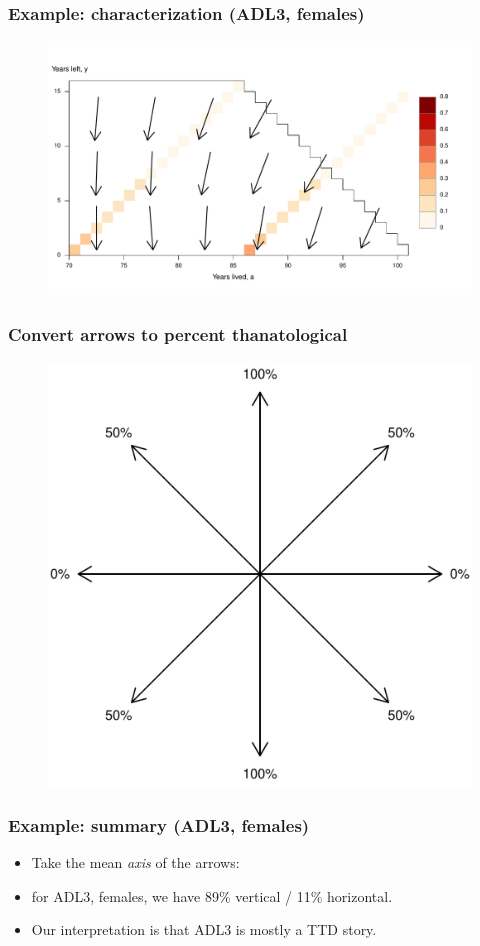 \documentclass{beamer}
\begin{document}
\begin{frame}
\frametitle{Example: characterization (ADL3, females)}
\begin{figure}
\includegraphics[width=\linewidth]{Figures/SurfExampleFemalesADL3_3}
\end{figure}
\end{frame}

\begin{frame}
\frametitle{Convert arrows to percent thanatological}
\vspace{-1em}
\begin{figure}
\includegraphics[width=.5\linewidth]{Figures/ArrowDiagram}
\end{figure}
\end{frame}

\begin{frame}
\frametitle{Example: summary (ADL3, females)}
\begin{itemize}
\item Take the mean \textit{axis} of the arrows:
\item for ADL3, females, we have 89\% vertical / 11\% horizontal.
\item Our interpretation is that ADL3 is mostly a TTD story.
\end{itemize}
\end{frame}
\end{document}
